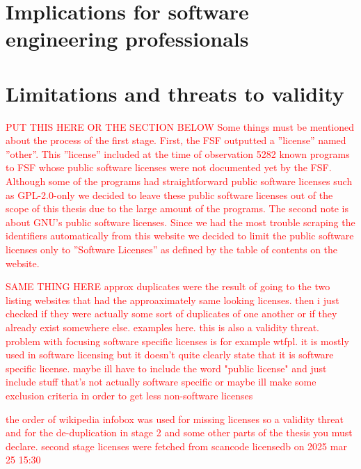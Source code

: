 

\section{Implications for software engineering professionals}




\section{Limitations and threats to validity}

\textcolor{red}{PUT THIS HERE OR THE SECTION BELOW Some things must be mentioned about the process of the first stage. First, the FSF outputted a ''license'' named ''other''. This ''license'' included at the time of observation 5282 known programs to FSF whose public software licenses were not documented yet by the FSF. Although some of the programs had straightforward public software licenses such as GPL-2.0-only we decided to leave these public software licenses out of the scope of this thesis due to the large amount of the programs. The second note is about GNU's public software licenses. Since we had the most trouble scraping the identifiers automatically from this website we decided to limit the public software licenses only to ''Software Licenses'' as defined by the table of contents on the website. }

\textcolor{red}{SAME THING HERE approx duplicates were the result of going to the two listing websites that had the approaximately same looking licenses. then i just checked if they were actually some sort of duplicates of one another or if they already exist somewhere else. examples here. this is also a validity threat. problem with focusing software specific licenses is for example wtfpl. it is mostly used in software licensing but it doesn't quite clearly state that it is software specific license. maybe ill have to include the word "public license" and just include stuff that's not actually software specific or maybe ill make some exclusion criteria in order to get less non-software licenses}

\textcolor{red}{the order of wikipedia infobox was used for missing licenses so a validity threat and for the de-duplication in stage 2 and some other parts of the thesis you must declare. second stage licenses were fetched from scancode licensedb on 2025 mar 25 15:30}

